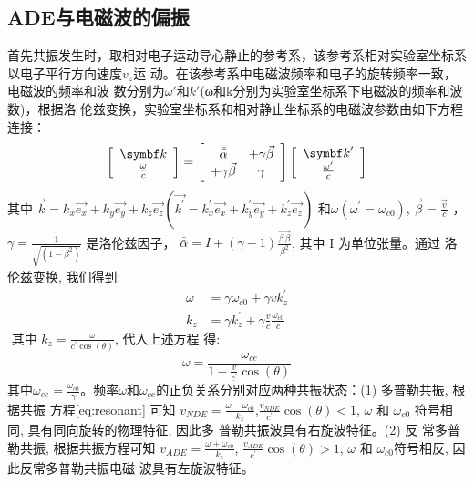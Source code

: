 \subsection{ADE与电磁波的偏振}
首先共振发生时，取相对电子运动导心静止的参考系，该参考系相对实验室坐标系以电子平行方向速度$v_z$运
动。在该参考系中电磁波频率和电子的旋转频率一致，电磁波的频率和波
数分别为$ω'$和$k'$(ω和k分别为实验室坐标系下电磁波的频率和波数)，根据洛
伦兹变换，实验室坐标系和相对静止坐标系的电磁波参数由如下方程连接：
\begin{equation}
\left[\begin{array}{c}
{\vk} \\
\frac{\omega}{c}
\end{array}\right]=\left[\begin{array}{cc}
\bar{\bar{\alpha}} & +\gamma {\vec{\beta}} \\
+\gamma {\vec{\beta}} & \gamma
\end{array}\right]\left[\begin{array}{c}
{\vk}^{\prime} \\
\frac{\omega^{\prime}}{c} 
\end{array}\right]
\end{equation}
其中  $\vec{k}=k_{x} \overrightarrow{e_{x}}+k_{y} \overrightarrow{e_{y}}+k_{z} 
\overrightarrow{e_{z}}\left(\overrightarrow{k^{\prime}}=k_{x}^{\prime} 
\overrightarrow{e_{x}}+k_{y}^{\prime} \overrightarrow{e_{y}}+k_{z}^{\prime} 
\overrightarrow{e_{z}}\right) $ 和$ \omega\left(\omega^{\prime}=\omega_{c 0}
\right)  $, $  \vec{\beta}=\frac{\vec{v}}{c}$ ， $\gamma=\frac{1}
{\sqrt{\left(1-\beta^{2}\right)}} $ 是洛伦兹因子， $ \bar{\bar{\alpha}}=I+
(\gamma-1) \frac{\vec{\beta} \vec{\beta}}{\beta^{2}} $, 其中 I 为单位张量。通过
洛伦兹变换, 我们得到:
\begin{equation}
\begin{aligned}\omega & =\gamma \omega_{c 0}+\gamma v k_{z}^{\prime} \\
k_{z} & =\gamma k_{z}^{\prime}+\gamma \frac{v}{c} \frac{\omega_{c 0}}{c}
\end{aligned}
\end{equation}
$\text { 其中 } k_{z}=\frac{\omega}{c^{\prime} \cos (\theta)} \text {, 代入上述方程
得: }$
\begin{equation}
\omega=\frac{\omega_{c e}}{1-\frac{v}{c^{\prime}} \cos (\theta)}
\end{equation}
其中$  \omega_{c e}=\frac{\omega_{c 0}}{\gamma} $。频率$\omega$和$\omega_{ce}$的正负关系分别对应两种共振状态：(1) 多普勒共振, 根据共振
方程\eqref{eq:resonant}	可知 $ v_{N D E}=   \frac{\omega-\omega_{c 0}}{k_{z}}
$,$ \frac{v_{N D E}}{c^{\prime}} \cos (\theta)<1$, $\omega $ 和  $\omega_{c 0} $ 
符号相同, 具有同向旋转的物理特征, 因此多 普勒共振波具有右旋波特征。(2) 反
常多普勒共振, 根据共振方程可知 $ v_{A D E}=\frac{\omega+\omega_{c 0}}
{k_{z}}$, $\frac{v_{A D E}}{c^{\prime}} \cos (\theta)>1$, $\omega $ 和 $ 
\omega_{c 0}  $符号相反, 因此反常多普勒共振电磁 波具有左旋波特征。

